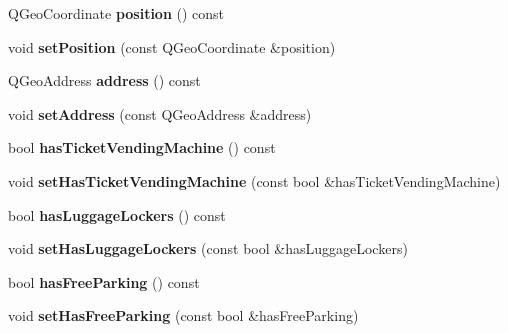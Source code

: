 \begin{DoxyCompactItemize}
\mbox{\label{classStationEngine_1_1Station_a139e180c6a82519db7b4b6249aa4b353}} 
Q\+Geo\+Coordinate {\bfseries position} () const
\item 
\mbox{\label{classStationEngine_1_1Station_ae336cacb81a3a6832e74a6a6c7c81242}} 
void {\bfseries set\+Position} (const Q\+Geo\+Coordinate \&position)
\item 
\mbox{\label{classStationEngine_1_1Station_ad0ca1a356a5b3b97a7f3506a21963a17}} 
Q\+Geo\+Address {\bfseries address} () const
\item 
\mbox{\label{classStationEngine_1_1Station_a186b3fb78bdd5dfbd169ff6d09b55d9a}} 
void {\bfseries set\+Address} (const Q\+Geo\+Address \&address)
\item 
\mbox{\label{classStationEngine_1_1Station_a686c92468373024b437f0589192668aa}} 
bool {\bfseries has\+Ticket\+Vending\+Machine} () const
\item 
\mbox{\label{classStationEngine_1_1Station_a9791d7b50eed4fad65f2fe5a2ca87876}} 
void {\bfseries set\+Has\+Ticket\+Vending\+Machine} (const bool \&has\+Ticket\+Vending\+Machine)
\item 
\mbox{\label{classStationEngine_1_1Station_a09182a137537232a38bc44f00e274355}} 
bool {\bfseries has\+Luggage\+Lockers} () const
\item 
\mbox{\label{classStationEngine_1_1Station_a55fe035b25a59286aa257113c70b6d01}} 
void {\bfseries set\+Has\+Luggage\+Lockers} (const bool \&has\+Luggage\+Lockers)
\item 
\mbox{\label{classStationEngine_1_1Station_adacc2051c657557f3494168e12cd9809}} 
bool {\bfseries has\+Free\+Parking} () const
\item 
\mbox{\label{classStationEngine_1_1Station_a19b10db4449466770ca0a210ef0b400a}} 
void {\bfseries set\+Has\+Free\+Parking} (const bool \&has\+Free\+Parking)

\end{DoxyCompactItemize}
